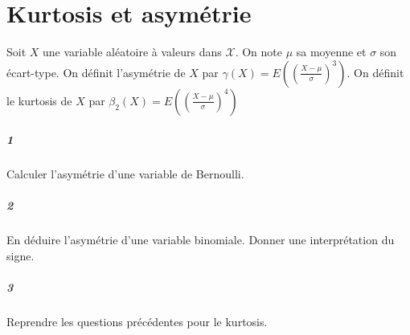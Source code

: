 \documentclass[10pt,a4paper]{article}
\begin{document}
\section{Kurtosis et asymétrie}
Soit $X$ une variable aléatoire à valeurs dans $\mathcal{X}$. On note $\mu$ sa moyenne et $\sigma$ son écart-type. On définit l'asymétrie de $X$ par $\gamma(X) = E \left( \left(\frac{X-\mu}{\sigma}\right)^3\right)$. On définit le kurtosis de $X$ par $\beta_2(X) = E \left( \left(\frac{X-\mu}{\sigma}\right)^4\right)$
\subparagraph{1}Calculer l'asymétrie d'une variable de Bernoulli.
\subparagraph{2}En déduire l'asymétrie d'une variable binomiale. Donner une interprétation du signe.
\subparagraph{3}Reprendre les questions précédentes pour le kurtosis.
\end{document}
